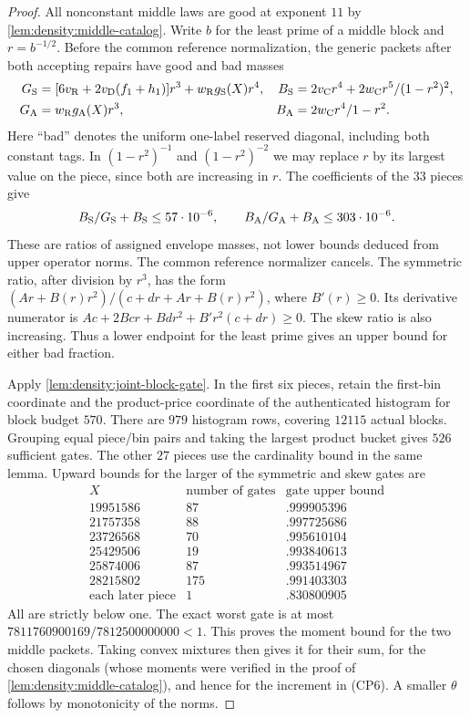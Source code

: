 \begin{proof}
All nonconstant middle laws are good at exponent $11$ by
\cref{lem:density:middle-catalog}. Write $b$ for the least prime of a middle block and $r=b^{-1/2}$. Before the common reference normalization,
the generic packets after both accepting repairs have good and bad masses
\begin{align*}
 G_{\rm S}&=[6v_{\rm R}+2v_{\rm D}(f_1+h_1)]r^3
                  +w_{\rm R}g_{\rm S}(X)r^4,&
 B_{\rm S}&=2v_{\rm C}r^4+\frac{2w_{\rm C}r^5}{(1-r^2)^2},\\
 G_{\rm A}&=w_{\rm R}g_{\rm A}(X)r^3,&
 B_{\rm A}&=\frac{2w_{\rm C}r^4}{1-r^2}.
\end{align*}
Here ``bad'' denotes the uniform one-label reserved diagonal, including
both constant tags. In $(1-r^2)^{-1}$ and $(1-r^2)^{-2}$ we may replace $r$ by its largest value on the piece, since both are increasing in $r$. The coefficients of the $33$ pieces give
\begin{equation}\label{eq:density:middle-bad-fractions}
 \frac{B_{\rm S}}{G_{\rm S}+B_{\rm S}}\le57\cdot10^{-6},
 \qquad
 \frac{B_{\rm A}}{G_{\rm A}+B_{\rm A}}\le303\cdot10^{-6}.
\end{equation}
These are ratios of assigned envelope masses, not lower bounds deduced
from upper operator norms. The common reference normalizer cancels.
The symmetric ratio, after division by $r^3$, has the form
$(Ar+B(r)r^2)/(c+dr+Ar+B(r)r^2)$, where $B'(r)\ge0$.
Its derivative numerator is
$Ac+2Bcr+Bdr^2+B'r^2(c+dr)\ge0$.
The skew ratio is also increasing. Thus a lower endpoint for the
least prime gives an upper bound for either bad fraction.

Apply \cref{lem:density:joint-block-gate}. In the first six pieces,
retain the first-bin coordinate and the product-price coordinate of
the authenticated histogram for block budget $570$. There are $979$ histogram rows,
covering $12115$ actual blocks. Grouping equal piece/bin pairs and taking
the largest product bucket gives $526$ sufficient gates. The other $27$ pieces use the cardinality bound in the same lemma. Upward bounds for
the larger of the symmetric and skew gates are
\[
\begin{array}{c|r|c}
X&\text{number of gates}&\text{gate upper bound}\\ \hline
19951586&87&.999905396\\
21757358&88&.997725686\\
23726568&70&.995610104\\
25429506&19&.993840613\\
25874006&87&.993514967\\
28215802&175&.991403303\\
\text{each later piece}&1&.830800905
\end{array}
\]
All are strictly below one. The exact worst gate is at most
$7811760900169/7812500000000<1$.
This proves the moment bound for the two middle packets. Taking
convex mixtures then gives it for their sum, for the chosen
diagonals (whose moments were verified in the proof of \cref{lem:density:middle-catalog}), and hence for the increment in (CP6). A smaller $\theta$
follows by monotonicity of the norms.


\end{proof}
